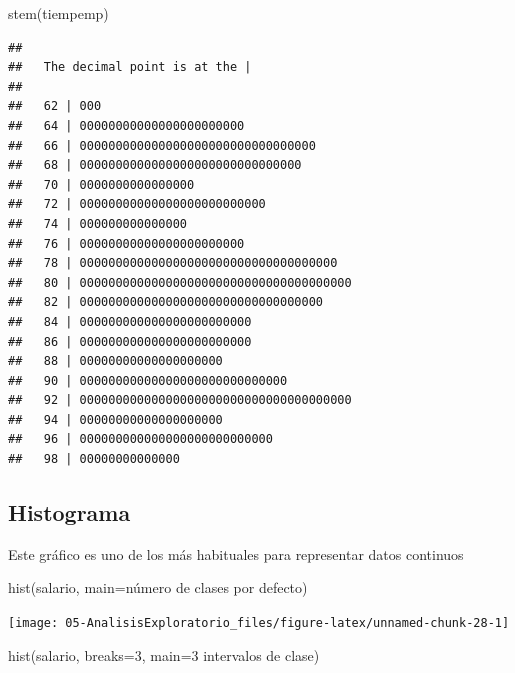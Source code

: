 \documentclass[
]{book}
\newenvironment{Shaded}{\begin{snugshade}}{\end{snugshade}}
\newcommand{\AttributeTok}[1]{\textcolor[rgb]{0.77,0.63,0.00}{#1}}
\newcommand{\DecValTok}[1]{\textcolor[rgb]{0.00,0.00,0.81}{#1}}
\newcommand{\FunctionTok}[1]{\textcolor[rgb]{0.00,0.00,0.00}{#1}}
\newcommand{\NormalTok}[1]{#1}
\newcommand{\StringTok}[1]{\textcolor[rgb]{0.31,0.60,0.02}{#1}}
\theoremstyle{break}
\theoremstyle{nonumberplain}
\begin{document}
\begin{Shaded}
\begin{Highlighting}[]
\FunctionTok{stem}\NormalTok{(tiempemp)}
\end{Highlighting}
\end{Shaded}

\begin{verbatim}
## 
##   The decimal point is at the |
## 
##   62 | 000
##   64 | 00000000000000000000000
##   66 | 000000000000000000000000000000000
##   68 | 0000000000000000000000000000000
##   70 | 0000000000000000
##   72 | 00000000000000000000000000
##   74 | 000000000000000
##   76 | 00000000000000000000000
##   78 | 000000000000000000000000000000000000
##   80 | 00000000000000000000000000000000000000
##   82 | 0000000000000000000000000000000000
##   84 | 000000000000000000000000
##   86 | 000000000000000000000000
##   88 | 00000000000000000000
##   90 | 00000000000000000000000000000
##   92 | 00000000000000000000000000000000000000
##   94 | 00000000000000000000
##   96 | 000000000000000000000000000
##   98 | 00000000000000
\end{verbatim}

\hypertarget{histograma}{%
\subsection{Histograma}\label{histograma}}

Este gráfico es uno de los más habituales para representar datos continuos

\begin{Shaded}
\begin{Highlighting}[]
\FunctionTok{hist}\NormalTok{(salario, }\AttributeTok{main=}\StringTok{\textquotesingle{}número de clases por defecto\textquotesingle{}}\NormalTok{)}
\end{Highlighting}
\end{Shaded}

\begin{center}\texttt{[image: 05-AnalisisExploratorio\_files/figure-latex/unnamed-chunk-28-1]} \end{center}

\begin{Shaded}
\begin{Highlighting}[]
\FunctionTok{hist}\NormalTok{(salario, }\AttributeTok{breaks=}\DecValTok{3}\NormalTok{, }\AttributeTok{main=}\StringTok{\textquotesingle{}3 intervalos de clase\textquotesingle{}}\NormalTok{)}
\end{Highlighting}
\end{Shaded}
\end{document}
